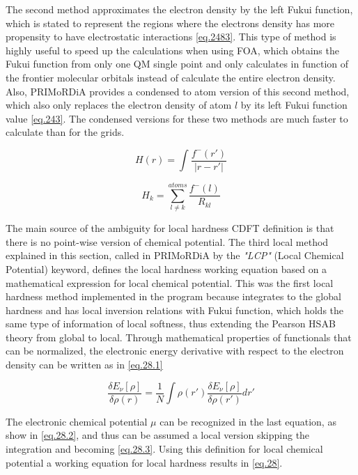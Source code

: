 \documentclass[a4paper,11pt]{refart}
\begin{document}
The second method approximates the electron density by the left Fukui function, which is stated to represent the regions where the electrons density has more propensity to have electrostatic interactions \autoref{eq.2483}. This type of method is highly useful to speed up the calculations when using FOA, which obtains the Fukui  function from only one QM single point and only calculates in function of the frontier molecular orbitals instead of calculate the entire electron density.  Also, PRIMoRDiA provides a condensed to atom version of this second method, which also only replaces the electron density of atom $l$ by its left Fukui function value \autoref{eq.243}. The condensed versions for these two methods are much faster to calculate than for the grids. 

\begin{equation}
H(r) = \int \frac{f^{-}(r')}{|r - r'|}
\label{eq.2483}
\end{equation}

\begin{equation}
H_k = \sum_{l \neq k}^{atoms} \frac{f^{-}(l)}{R_{kl}}
\label{eq.243}
\end{equation}

The main source of the ambiguity for local hardness CDFT definition is that there is no point-wise version of chemical potential. The third local method explained in this section, called in PRIMoRDiA by the \emph{"LCP"} (Local Chemical Potential) keyword, defines the local hardness working equation based on a mathematical expression for local chemical potential. This  was the first local hardness method implemented in the program because integrates to the global hardness and has local inversion relations with Fukui function, which holds the same type of information of local softness, thus extending the Pearson HSAB theory from global to local. Through mathematical properties of functionals that can be normalized, the electronic energy derivative with respect to the electron density can be written as in \autoref{eq.28.1}

\begin{equation}
\frac{\delta E_\nu[\rho]}{\delta \rho(r)} = \frac{1}{N} \int \rho(r') \frac{\delta E_\nu[\rho]}{\delta \rho(r')} dr'
\label{eq.28.1}
\end{equation}

The electronic chemical potential $\mu$ can be recognized in the last equation, as show in \autoref{eq.28.2}, and thus can be assumed a local version skipping the integration and becoming \autoref{eq.28.3}. Using this definition for local chemical potential a working equation for local hardness results in \autoref{eq.28}. 
\end{document}
